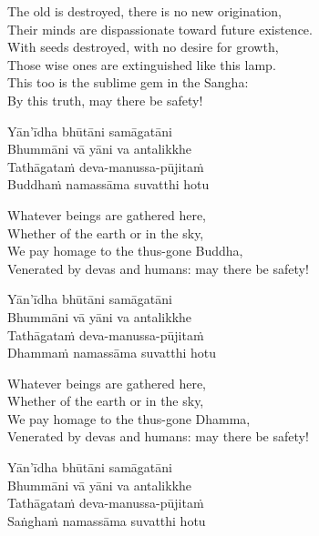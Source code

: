 \begin{english-verses}
  The old is destroyed, there is no new origination,\\
  Their minds are dispassionate toward future existence.\\
  With seeds destroyed, with no desire for growth,\\
  Those wise ones are extinguished like this lamp.\\
  This too is the sublime gem in the Sangha:\\
  By this truth, may there be safety!
\end{english-verses}

\begin{pali-hang-continued}
  Yān'īdha bhūtāni samāgatāni\\
  Bhummāni vā yāni va antalikkhe\\
  Tathāgataṁ deva-manussa-pūjitaṁ\\
  Buddhaṁ namassāma suvatthi hotu
\end{pali-hang-continued}

\begin{english-verses}
  Whatever beings are gathered here,\\
  Whether of the earth or in the sky,\\
  We pay homage to the thus-gone Buddha,\\
  Venerated by devas and humans: may there be safety!
\end{english-verses}

\begin{pali-hang-continued}
  Yān'īdha bhūtāni samāgatāni\\
  Bhummāni vā yāni va antalikkhe\\
  Tathāgataṁ deva-manussa-pūjitaṁ\\
  Dhammaṁ namassāma suvatthi hotu
\end{pali-hang-continued}

\begin{english-verses}
  Whatever beings are gathered here,\\
  Whether of the earth or in the sky,\\
  We pay homage to the thus-gone Dhamma,\\
  Venerated by devas and humans: may there be safety!
\end{english-verses}

\begin{pali-hang-continued}
  Yān'īdha bhūtāni samāgatāni\\
  Bhummāni vā yāni va antalikkhe\\
  Tathāgataṁ deva-manussa-pūjitaṁ\\
  Saṅghaṁ namassāma suvatthi hotu
\end{pali-hang-continued}

